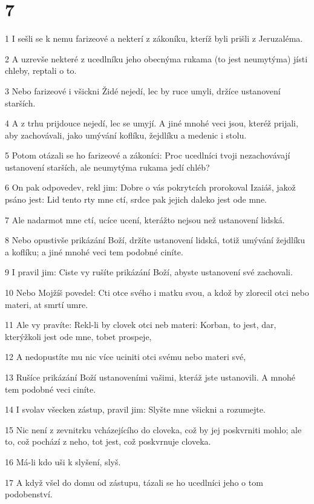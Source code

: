\chapter{7}

\par 1 I sešli se k nemu farizeové a nekterí z zákoníku, kteríž byli prišli z Jeruzaléma.
\par 2 A uzrevše nekteré z ucedlníku jeho obecnýma rukama (to jest neumytýma) jísti chleby, reptali o to.
\par 3 Nebo farizeové i všickni Židé nejedí, lec by ruce umyli, držíce ustanovení starších.
\par 4 A z trhu prijdouce nejedí, lec se umyjí. A jiné mnohé veci jsou, kteréž prijali, aby zachovávali, jako umývání koflíku, žejdlíku a medenic i stolu.
\par 5 Potom otázali se ho farizeové a zákoníci: Proc ucedlníci tvoji nezachovávají ustanovení starších, ale neumytýma rukama jedí chléb?
\par 6 On pak odpovedev, rekl jim: Dobre o vás pokrytcích prorokoval Izaiáš, jakož psáno jest: Lid tento rty mne ctí, srdce pak jejich daleko jest ode mne.
\par 7 Ale nadarmot mne ctí, ucíce ucení, kterážto nejsou než ustanovení lidská.
\par 8 Nebo opustivše prikázání Boží, držíte ustanovení lidská, totiž umývání žejdlíku a koflíku; a jiné mnohé veci tem podobné ciníte.
\par 9 I pravil jim: Ciste vy rušíte prikázání Boží, abyste ustanovení své zachovali.
\par 10 Nebo Mojžíš povedel: Cti otce svého i matku svou, a kdož by zlorecil otci nebo materi, at smrtí umre.
\par 11 Ale vy pravíte: Rekl-li by clovek otci neb materi: Korban, to jest, dar, kterýžkoli jest ode mne, tobet prospeje,
\par 12 A nedopustíte mu nic více uciniti otci svému nebo materi své,
\par 13 Rušíce prikázání Boží ustanoveními vašimi, kteráž jste ustanovili. A mnohé tem podobné veci ciníte.
\par 14 I svolav všecken zástup, pravil jim: Slyšte mne všickni a rozumejte.
\par 15 Nic není z zevnitrku vcházejícího do cloveka, což by jej poskvrniti mohlo; ale to, což pochází z neho, tot jest, což poskvrnuje cloveka.
\par 16 Má-li kdo uši k slyšení, slyš.
\par 17 A když všel do domu od zástupu, tázali se ho ucedlníci jeho o tom podobenství.
